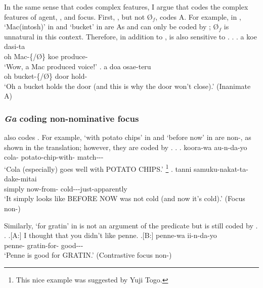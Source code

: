 In the same sense that  codes complex features,
I argue that  codes the complex features
of agent, , and focus.
First,
, but not {\O$_{f}$}, codes  A. For example, in \Next,  `Mac(intosh)' in \Next[a] and  `bucket' in \Next[b]
are  As
and can only be coded by ;
{\O$_{f}$} is unnatural in this context.
Therefore, in addition to ,
 is also sensitive to .
%
\ex. \label{ExInanimateA}
 \ag. a  koe dasi-ta \\
  oh Mac-\{/{\O}\} koe produce- \\
  `Wow, a Mac produced voice!'
 \bg. a  doa osae-teru \\
  oh bucket-\{/{\O}\} door hold- \\
  `Oh a bucket holds the door (and this is why the door won't close).'
   \hfill{(Inanimate A)}

\subsubsection{\textit{Ga} coding non-nominative focus}\label{Par:CasePar:Ga:GaFoc}

 also codes .
For example, 
 `with potato chips' in \Next[a] and
 `before now' in \Next[b]
are non-,
as shown in the translation;
however, they are coded by .
%
\ex.\label{ExNon-ArgFocus}
 \ag. koora-wa  au-n-da-yo \\
   cola- potato-chip-with- match--- \\
   `Cola (especially) goes well with POTATO CHIPS.'%
    \footnote{
    This nice example was suggested by Yuji Togo.
    }
 \bg. tanni  samuku-nakat-ta-dake-mitai \\
   simply now-from- cold---just-apparently \\
   `It simply looks like BEFORE NOW was not cold (and now it's cold).'
 \hfill{(Focus non-)}

Similarly,
 `for gratin' in \Next[B] is not an argument of the predicate
but is still coded by .
%
\ex. \a.[A:] I thought that you didn't like penne.
	\bg.[B:] penne-wa  ii-n-da-yo \\
	penne- gratin-for- good--- \\
	`Penne is good for GRATIN.' \hfill{(Contrastive focus non-)}

